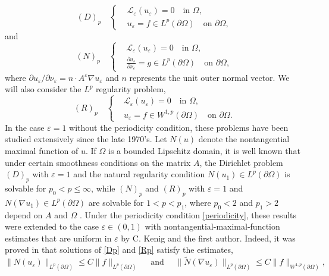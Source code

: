 \documentclass[reqno,12pt]{amsart} %
\theoremstyle{definition}
\theoremstyle{remark}
\numberwithin{equation}{section}
\newcommand{\cL}{\mathcal{L}}
\newcommand{\e}{\varepsilon}
\begin{document}
\begin{equation}\label{Dp}
    (D)_p \quad \left\{
    \begin{aligned}
        & \cL_\e(u_\e) = 0 \quad \text{in } \Omega, \\
        & u_\e = f \in L^p(\partial \Omega) \quad \text{on } \partial \Omega,
    \end{aligned}
    \right.
\end{equation}
and 
\begin{equation}\label{Np}
    (N)_p \quad \left\{
    \begin{aligned}
        & \cL_\e(u_\e) = 0 \quad \text{in } \Omega, \\
        & \frac{\partial u_\e}{\partial \nu_\e} = g \in L^p(\partial \Omega) \quad \text{on } \partial \Omega,
    \end{aligned}
    \right.
\end{equation}
where $\partial u_\e/\partial \nu_\e = n\cdot A^\e \nabla u_\e$ and $n$ represents the unit outer normal vector.
We will also consider the $L^p$ regularity problem,
\begin{equation}\label{Rp}
    (R)_p \quad \left\{
    \begin{aligned}
        & \cL_\e(u_\e) = 0 \quad \text{in } \Omega, \\
        & u_\e = f \in W^{1, p}(\partial \Omega) \quad \text{on } \partial \Omega.
    \end{aligned}
    \right.
\end{equation}
In the case $\e=1$ without the periodicity condition, these problems have been studied 
extensively since the late 1970's.
Let $N(u)$ denote the nontangential maximal function of $u$.
If $\Omega$ is a bounded Lipschitz domain,
it is well known that under certain smoothness conditions on the matrix $A$, 
the Dirichlet problem $(D)_p$ with $\e=1$ and the natural regularity condition $N(u_1)\in L^p(\partial\Omega)$ 
is solvable for $p_0< p\le \infty$, while 
$(N)_p$ and $(R)_p$ with $\e=1$ and $N(\nabla u_1)\in L^p(\partial\Omega)$ are solvable for $1< p< p_1$, where $p_0<2 $ and $p_1>2$ depend on $A$ and $\Omega$ \cite{K94}.
Under the periodicity condition \eqref{periodicity},
these results were extended to the case $\e\in (0, 1)$
with nontangential-maximal-function estimates that are uniform in $\e$
by C. Kenig and the first author.
Indeed, it was proved in \cite{KS11, KS11-2} that 
solutions of \eqref{Dp} and \eqref{Rp} satisfy the estimates,
\begin{equation}\label{uni-1}
\|N(u_\e) \|_{L^p(\partial\Omega)}
\le C \| f \|_{L^p(\partial\Omega)}
\quad \text{ and } \quad 
\|\widetilde{N}(\nabla u_\e) \|_{L^p(\partial\Omega)}
\le C \| f \|_{W^{1, p}(\partial\Omega)},
\end{equation}
\end{document}
